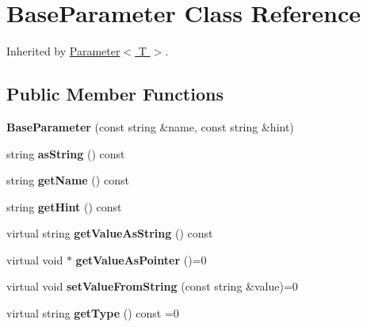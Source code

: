 \hypertarget{classrrp_1_1_base_parameter}{\section{Base\-Parameter Class Reference}
\label{classrrp_1_1_base_parameter}
}


Inherited by \hyperlink{classrrp_1_1_parameter}{Parameter$<$ T $>$}.

\subsection*{Public Member Functions}
\begin{DoxyCompactItemize}
\item 
\hypertarget{classrrp_1_1_base_parameter_a970cc2f14b4189e070e565af2cfe63ff}{{\bfseries Base\-Parameter} (const string \&name, const string \&hint)}\label{classrrp_1_1_base_parameter_a970cc2f14b4189e070e565af2cfe63ff}

\item 
\hypertarget{classrrp_1_1_base_parameter_a1597391adafcdb392650d766134cad71}{string {\bfseries as\-String} () const }\label{classrrp_1_1_base_parameter_a1597391adafcdb392650d766134cad71}

\item 
\hypertarget{classrrp_1_1_base_parameter_a5e164ba33b1dfc211559756aa5d486c0}{string {\bfseries get\-Name} () const }\label{classrrp_1_1_base_parameter_a5e164ba33b1dfc211559756aa5d486c0}

\item 
\hypertarget{classrrp_1_1_base_parameter_aa2d05515fc07a9e3dca00f51e1cbeb06}{string {\bfseries get\-Hint} () const }\label{classrrp_1_1_base_parameter_aa2d05515fc07a9e3dca00f51e1cbeb06}

\item 
\hypertarget{classrrp_1_1_base_parameter_a24d311dd987ec8f5ddf08d0fcdf97d48}{virtual string {\bfseries get\-Value\-As\-String} () const }\label{classrrp_1_1_base_parameter_a24d311dd987ec8f5ddf08d0fcdf97d48}

\item 
\hypertarget{classrrp_1_1_base_parameter_a42e0945eeba1664c4db99809350ef517}{virtual void $\ast$ {\bfseries get\-Value\-As\-Pointer} ()=0}\label{classrrp_1_1_base_parameter_a42e0945eeba1664c4db99809350ef517}

\item 
\hypertarget{classrrp_1_1_base_parameter_a5ada738341dca681a24d6de326ae250a}{virtual void {\bfseries set\-Value\-From\-String} (const string \&value)=0}\label{classrrp_1_1_base_parameter_a5ada738341dca681a24d6de326ae250a}

\item 
\hypertarget{classrrp_1_1_base_parameter_af19830937483771a291bd8f8f60452ac}{virtual string {\bfseries get\-Type} () const =0}\label{classrrp_1_1_base_parameter_af19830937483771a291bd8f8f60452ac}

\end{DoxyCompactItemize}
